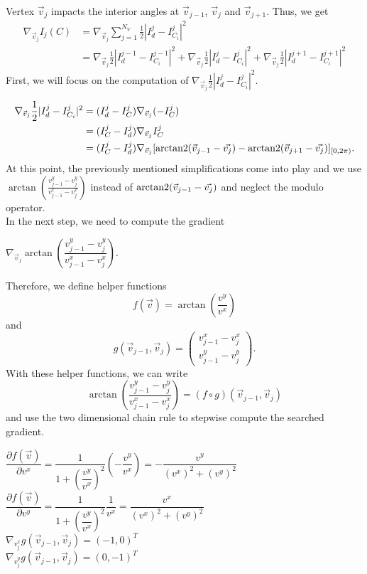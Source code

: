 \begin{proposition}
	Vertex $\vec{v}_j$ impacts the interior angles at $\vec{v}_{j-1}$, $\vec{v}_j$ and $\vec{v}_{j+1}$. 
	Thus, we get 
	\begin{align*}
		\nabla_{\vec{v}_j}  I_{j}(C) &=  \nabla_{\vec{v}_j} \sum\limits_{j=1}^{N_V} \frac{1}{2}| I^{j}_d - I^j_{C_i} |^2 \\
		&= \nabla_{\vec{v}_j} \frac{1}{2}| I^{j-1}_d - I^{j-1}_{C_i} |^2 
		+ \nabla_{\vec{v}_j} \frac{1}{2}| I^{j}_d - I^{j}_{C_i} |^2 
		+ \nabla_{\vec{v}_j} \frac{1}{2}| I^{j+1}_d - I^{j+1}_{C_i} |^2
	\end{align*}
	First, we will focus on the computation of $\nabla_{\vec{v}_j} \frac{1}{2}| I^{j}_d - I^{j}_{C_i} |^2$. 

	\begin{align*}
		\nabla_{\vec{v}_j} \frac{1}{2}| I^{j}_d - I^{j}_{C_i} |^2 
		&= (I^{j}_d - I^j_{C}) \nabla_{\vec{v}_j} (- I^j_{C})\\
		&= (I^j_{C} - I^{j}_d) \nabla_{\vec{v}_j}  I^j_{C}   \\
		&= (I^j_{C} - I^{j}_d) \nabla_{\vec{v}_j} [\operatorname{arctan2}(\vec{v}_{j-1} - \vec{v_j}) - \operatorname{arctan2}(\vec{v}_{j+1} - \vec{v_j})]_{[0,2\pi)}.
	\end{align*}
	At this point, the previously mentioned simplifications come into play and we use $\arctan \left(\frac{v_{j-1}^{y} - v_{j}^{y}}{v_{j-1}^{x} - v_{j}^{x}} \right)$ instead of $\operatorname{arctan2}(\vec{v}_{j-1} - \vec{v_j})$ and neglect the modulo operator. \\
	In the next step, we need to compute the gradient 
	\begin{center}
		$
		\nabla_{\vec{v}_j} \arctan \left(\dfrac{v_{j-1}^{y} - v_{j}^{y}}{v_{j-1}^{x} - v_{j}^{x}} \right).
		$
	\end{center}
	
	Therefore, we define helper functions 
	$$ f(\vec{v}) = \arctan\left( \frac{v^{y}}{v^{x}} \right)$$ 
	and 
	$$g(\vec{v}_{j-1}, \vec{v}_{j}) = \begin{pmatrix}
		v_{j-1}^{x} - v_{j}^{x} \\[0.5em] 
		v_{j-1}^{y} - v_{j}^{y}
	\end{pmatrix}.$$
	With these helper functions, we can write 
	$$ \arctan\left(\frac{v_{j-1}^{y} - v_{j}^{y}}{v_{j-1}^{x} - v_{j}^{x}}\right) = (f \circ g) (\vec{v}_{j-1}, \vec{v}_{j}) $$
	and use the two dimensional chain rule to stepwise compute the searched gradient. 
 
	\begin{center}
		
		$\dfrac{\partial f(\vec{v})}{\partial v^{x}} = \dfrac{1}{1 + \left(\dfrac{v^{y}}{v^{x}}\right)^2} \left(- \dfrac{v^{y}}{v^{x}}\right) = - \dfrac{v^{y}}{(v^{x})^2 + (v^{y})^2}$ \\
		$\dfrac{\partial f(\vec{v})}{\partial v^{y}} = \dfrac{1}{1 + \left(\dfrac{v^{y}}{v^{x}}\right)^2}  \dfrac{1}{v^{x}} =  \dfrac{v^{x}}{(v^{x})^2 + (v^{y})^2}$ \\ [0.5em]
		$ \nabla_{v_j^{x}} g(\vec{v}_{j-1}, \vec{v}_{j}) = (-1, 0)^T$ \\
		$ \nabla_{v_j^{y}} g(\vec{v}_{j-1}, \vec{v}_{j}) = (0, -1)^T$ 
	

\end{center}
\end{proposition}
